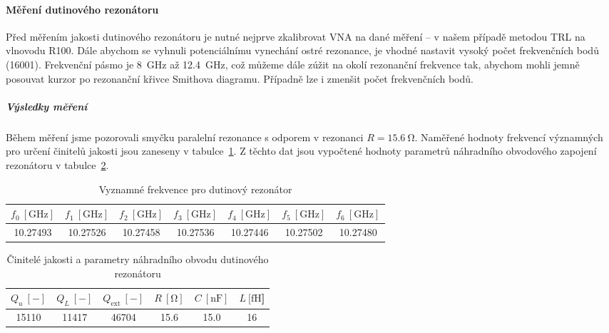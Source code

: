 \documentclass[11pt,a4paper]{article}
\newcommand{\Ohm}{\mathrm{\Omega}}
\newcommand{\GHz}{\mathrm{GHz}}
\begin{document}
\paragraph*{Měření dutinového rezonátoru} Před měřením jakosti dutinového rezonátoru je nutné nejprve zkalibrovat VNA na dané měření -- v našem případě metodou TRL na vlnovodu R100. Dále abychom se vyhnuli potenciálnímu vynechání ostré rezonance, je vhodné nastavit vysoký počet frekvenčních bodů (16001). Frekvenční pásmo je 8~GHz až 12.4~GHz, což můžeme dále zúžit na okolí rezonanční frekvence tak, abychom mohli jemně posouvat kurzor po rezonanční křivce Smithova diagramu. Případně lze i zmenšit počet frekvenčních bodů.

\subparagraph*{Výsledky měření} Během měření jsme pozorovali smyčku paralelní rezonance s odporem v rezonanci $R = 15.6\ \Ohm$. Naměřené hodnoty frekvencí významných pro určení činitelů jakosti jsou zaneseny v tabulce~\ref{table:dutinovy-rezonator-frekvence}. Z těchto dat jsou vypočtené hodnoty parametrů náhradního obvodového zapojení rezonátoru v tabulce~\ref{table:dutinovy-rezonator-hodnoty}.
\begin{table}[!ht]
\centering
\begin{tabular}{|c|c|c|c|c|c|c|}
    \hline
    $f_0\ [\GHz]$ & $f_1\ [\GHz]$ & $f_2\ [\GHz]$ & $f_3\ [\GHz]$ & $f_4\ [\GHz]$ & $f_5\ [\GHz]$ & $f_6\ [\GHz]$\\
    \hline\hline
    10.27493 & 10.27526 & 10.27458 & 10.27536 & 10.27446 & 10.27502 & 10.27480\\
    \hline
\end{tabular}
\caption{\label{table:dutinovy-rezonator-frekvence}Vyznamné frekvence pro dutinový rezonátor}
\end{table}
\begin{table}[!ht]
\centering
\begin{tabular}{|c|c|c|c|c|c|}
    \hline
    $Q_u\ [-]$ & $Q_L\ [-]$ & $Q_{\mathrm{ext}}\ [-]$ & $R\ [\mathrm{\Omega}]$ & $C\ [\mathrm{nF}]$ & $L\ [\mathrm{fH}$]\\
    \hline\hline
    15110 & 11417 & 46704 & 15.6 & 15.0 & 16\\
    \hline
\end{tabular}
\caption{\label{table:dutinovy-rezonator-hodnoty}Činitelé jakosti a parametry náhradního obvodu dutinového rezonátoru}
\end{table}

\end{document}
